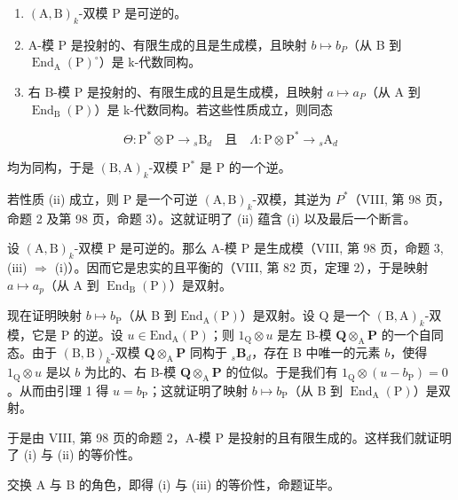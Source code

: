 \begin{enumerate}
\def\labelenumi{(\roman{enumi})}
\item
  \((\mathrm{A},\mathrm{B})_k\)-双模 P 是可逆的。
\item
  A-模 P 是投射的、有限生成的且是生成模，且映射 \(b \mapsto b_{P}\)（从 B 到 \(\operatorname{End}_{\mathrm{A}}(\mathrm{P})^{\circ}\)）是 k-代数同构。
\item
  右 B-模 P 是投射的、有限生成的且是生成模，且映射 \(a \mapsto a_{P}\)（从 A 到 \(\operatorname{End}_{\mathrm{B}}(\mathrm{P})\)）是 k-代数同构。若这些性质成立，则同态
\end{enumerate}

\[
\Theta : \mathrm{P} ^ {*} \otimes \mathrm{P} \to {} _ {s} \mathrm{B} _ {d} \quad \text{且} \quad \Lambda : \mathrm{P} \otimes \mathrm{P} ^ {*} \to {} _ {s} \mathrm{A} _ {d}
\]

均为同构，于是 \((\mathrm{B},\mathrm{A})_k\)-双模 \(\mathrm{P}^*\) 是 \(\mathrm{P}\) 的一个逆。

若性质 (ii) 成立，则 P 是一个可逆 \((\mathrm{A},\mathrm{B})_{k}\)-双模，其逆为 \(P^{*}\)（VIII, 第 98 页，命题 2 及第 98 页，命题 3）。这就证明了 (ii) 蕴含 (i) 以及最后一个断言。

设 \((\mathrm{A},\mathrm{B})_{k}\)-双模 P 是可逆的。那么 A-模 P 是生成模（VIII, 第 98 页，命题 3, (iii) \(\Rightarrow\) (i)）。因而它是忠实的且平衡的（VIII, 第 82 页，定理 2），于是映射 \(a \mapsto a_{p}\)（从 A 到 \(\operatorname{End}_{\mathrm{B}}(\mathrm{P})\)）是双射。

现在证明映射 \(b \mapsto b_{\mathrm{P}}\)（从 B 到 \(\mathrm{End}_{\mathrm{A}}(\mathrm{P})\)）是双射。设 Q 是一个 \((\mathrm{B},\mathrm{A})_k\)-双模，它是 P 的逆。设 \(u \in \mathrm{End}_{\mathrm{A}}(\mathrm{P})\)；则 \(1_{\mathrm{Q}} \otimes u\) 是左 B-模 \(\mathbf{Q} \otimes_{\mathrm{A}} \mathbf{P}\) 的一个自同态。由于 \((\mathrm{B},\mathrm{B})_k\)-双模 \(\mathbf{Q} \otimes_{\mathrm{A}} \mathbf{P}\) 同构于 \({}_s\mathbf{B}_d\)，存在 B 中唯一的元素 \(b\)，使得 \(1_{\mathrm{Q}} \otimes u\) 是以 \(b\) 为比的、右 B-模 \(\mathbf{Q} \otimes_{\mathrm{A}} \mathbf{P}\) 的位似。于是我们有 \(1_{\mathrm{Q}} \otimes (u - b_{\mathrm{P}}) = 0\)。从而由引理 1 得 \(u = b_{\mathrm{P}}\)；这就证明了映射 \(b \mapsto b_{\mathrm{P}}\)（从 B 到 \(\operatorname{End}_{\mathrm{A}}(\mathrm{P})\)）是双射。

于是由 VIII, 第 98 页的命题 2，A-模 P 是投射的且有限生成的。这样我们就证明了 (i) 与 (ii) 的等价性。

交换 A 与 B 的角色，即得 (i) 与 (iii) 的等价性，命题证毕。

